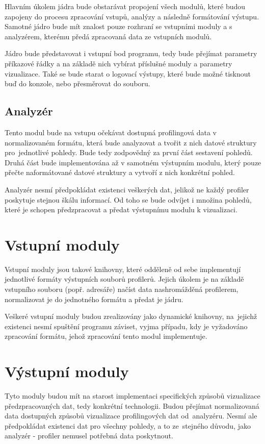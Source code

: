 \documentclass[czech,BP]{thesiskiv}
\begin{document}
Hlavním úkolem jádra bude obstarávat propojení všech modulů, které budou zapojeny do procesu zpracování vstupů, analýzy a následně formátování výstupu. Samotné jádro bude mít znalost pouze rozhraní se vstupními moduly a s analyzérem, kterému předá zpracovaná data ze vstupních modulů.

Jádro bude představovat i vstupní bod programu, tedy bude přejímat parametry příkazové řádky a na základě nich vybírat příslušné moduly a parametry vizualizace. Také se bude starat o logovací výstupy, které bude možné tisknout buď do konzole, nebo přesměrovat do souboru.

\subsection{Analyzér}

Tento modul bude na vstupu očekávat dostupná profilingová data v normalizovaném formátu, která bude analyzovat a tvořit z nich datové struktury pro~jednotlivé pohledy. Bude tedy zodpovědný za první část sestavení pohledů. Druhá část bude implementována až v samotném výstupním modulu, který pouze přečte naformátované datové struktury a vytvoří z nich konkrétní pohled.

Analyzér nesmí předpokládat existenci veškerých dat, jelikož ne každý profiler poskytuje stejnou škálu informací. Od toho se bude odvíjet i množina pohledů, které je schopen předzpracovat a předat výstupnímu modulu k vizualizaci.

\section{Vstupní moduly}

Vstupní moduly jsou takové knihovny, které odděleně od sebe implementují jednotlivé formáty výstupních souborů profilerů. Jejich úkolem je na základě vstupního souboru (popř. adresáře) načíst data nashromážděná profilerem, normalizovat je do jednotného formátu a předat je jádru. 

Veškeré vstupní moduly budou zrealizovány jako dynamické knihovny, na~jejichž existenci nesmí spuštění programu záviset, vyjma případu, kdy je vyžadováno zpracování formátu, jehož zpracování tento modul implementuje.

\section{Výstupní moduly}

Tyto moduly budou mít na starost implementaci specifických způsobů vizualizace předzpracovaných dat, tedy konkrétní technologii. Budou přejímat normalizovaná data dostupných způsobů vizualizace profilingových dat od~analyzéru. Nesmí ale předpokládat existenci dat pro všechny pohledy, a to ze~stejného důvodu, jako analyzér - profiler nemusel potřebná data poskytnout.
\end{document}
